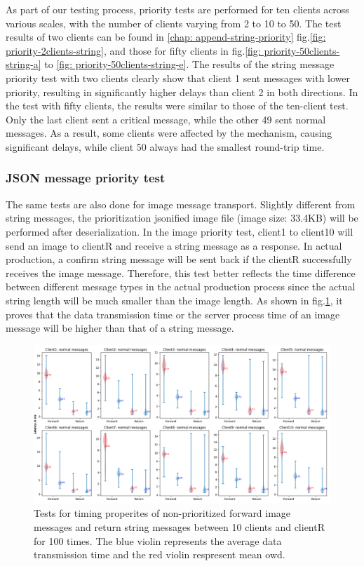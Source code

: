 As part of our testing process, priority tests are performed for ten clients across 
various scales, with the number of clients varying from 2 to 10 to 50. The test results 
of two clients can be found in \ref{chap: append-string-priority} fig.\ref{fig: priority-2clients-string}, 
and those for fifty clients in fig.\ref{fig: priority-50clients-string-a} to 
\ref{fig: priority-50clients-string-e}.  The results of the string message priority 
test with two clients clearly show that client 1 sent messages with lower priority, 
resulting in significantly higher delays than client 2 in both directions. In the test 
with fifty clients, the results were similar to those of the ten-client test. Only the 
last client sent a critical message, while the other 49 sent normal messages. As a 
result, some clients were affected by the mechanism, causing significant delays, while 
client 50 always had the smallest round-trip time.

\subsubsection{JSON message priority test}
The same tests are also done for image message transport. Slightly different from string 
messages, the prioritization jsonified image file (image size: 33.4KB) will be performed 
after deserialization. In the image priority test, client1 to client10 will send an image 
to clientR and receive a string message as a response. In actual production, a confirm 
string message will be sent back if the clientR successfully receives the image message. 
Therefore, this test better reflects the time difference between different message types 
in the actual production process since the actual string length will be much smaller than 
the image length. As shown in fig.\ref{fig: priority-10clients-c}, it proves that the data 
transmission time or the server process time of an image message 
will be higher than that of a string message.


\begin{figure}
    \centering
    \includegraphics[width=\textheight]{figures/tests/priority_tests/violin_10clients_image_non_priority.png}\hfill 
    \caption{Tests for timing properites of non-prioritized forward image messages and return string messages between 10 clients 
    and clientR for 100 times. The blue violin represents the average data transmission time and the red violin 
    respresent mean \gls{owd}.} \label{fig: priority-10clients-c}
\end{figure}



